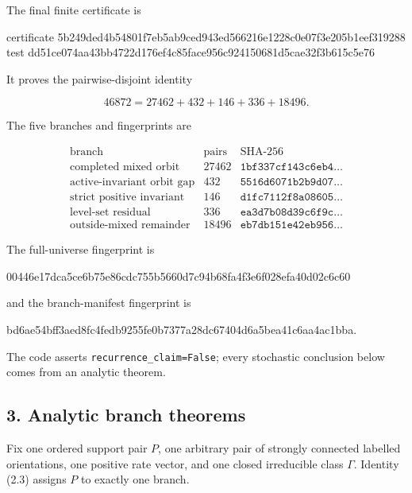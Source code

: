 The final finite certificate is

\begin{CodeBlock}
certificate 5b249ded4b54801f7eb5ab9ced943ed566216e1228c0e07f3e205b1eef319288
test        dd51ce074aa43bb4722d176ef4c85face956c924150681d5cae32f3b615c5e76
\end{CodeBlock}

It proves the pairwise-disjoint identity

\[
 46872=27462+432+146+336+18496.                         \tag{2.3}
\]

The five branches and fingerprints are

\[
\begin{array}{l|r|l}
\text{branch}&\text{pairs}&\text{SHA-256}\\ \hline
\text{completed mixed orbit}&27462&\texttt{1bf337cf143c6eb4}\ldots\\
\text{active-invariant orbit gap}&432&\texttt{5516d6071b2b9d07}\ldots\\
\text{strict positive invariant}&146&\texttt{d1fc7112f8a08605}\ldots\\
\text{level-set residual}&336&\texttt{ea3d7b08d39c6f9c}\ldots\\
\text{outside-mixed remainder}&18496&\texttt{eb7db151e42eb956}\ldots
\end{array}                                               \tag{2.4}
\]

The full-universe fingerprint is

\begin{CodeBlock}
00446e17dca5ce6b75e86cdc755b5660d7c94b68fa4f3e6f028efa40d02c6c60
\end{CodeBlock}

and the branch-manifest fingerprint is

\begin{CodeBlock}
bd6ae54bff3aed8fc4fedb9255fe0b7377a28dc67404d6a5bea41c6aa4ac1bba.
\end{CodeBlock}

The code asserts \texttt{recurrence\_claim=False}; every stochastic
conclusion below comes from an analytic theorem.

\subsection{3. Analytic branch theorems}

Fix one ordered support pair \(P\), one arbitrary pair of strongly
connected labelled orientations, one positive rate vector, and one
closed irreducible class \(\Gamma\). Identity (2.3) assigns \(P\) to
exactly one branch.

